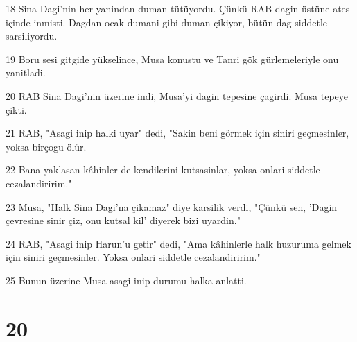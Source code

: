 \par 18 Sina Dagi'nin her yanindan duman tütüyordu. Çünkü RAB dagin üstüne ates içinde inmisti. Dagdan ocak dumani gibi duman çikiyor, bütün dag siddetle sarsiliyordu.
\par 19 Boru sesi gitgide yükselince, Musa konustu ve Tanri gök gürlemeleriyle onu yanitladi.
\par 20 RAB Sina Dagi'nin üzerine indi, Musa'yi dagin tepesine çagirdi. Musa tepeye çikti.
\par 21 RAB, "Asagi inip halki uyar" dedi, "Sakin beni görmek için siniri geçmesinler, yoksa birçogu ölür.
\par 22 Bana yaklasan kâhinler de kendilerini kutsasinlar, yoksa onlari siddetle cezalandiririm."
\par 23 Musa, "Halk Sina Dagi'na çikamaz" diye karsilik verdi, "Çünkü sen, 'Dagin çevresine sinir çiz, onu kutsal kil' diyerek bizi uyardin."
\par 24 RAB, "Asagi inip Harun'u getir" dedi, "Ama kâhinlerle halk huzuruma gelmek için siniri geçmesinler. Yoksa onlari siddetle cezalandiririm."
\par 25 Bunun üzerine Musa asagi inip durumu halka anlatti.

\chapter{20}


